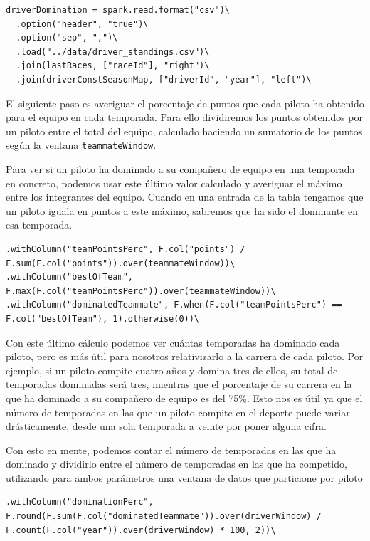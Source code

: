 \documentclass[12pt,twoside,titlepage]{report}
\begin{document}
\begin{lstlisting}
driverDomination = spark.read.format("csv")\
  .option("header", "true")\
  .option("sep", ",")\
  .load("../data/driver_standings.csv")\
  .join(lastRaces, ["raceId"], "right")\
  .join(driverConstSeasonMap, ["driverId", "year"], "left")\
\end{lstlisting}

El siguiente paso es averiguar el porcentaje de puntos que cada piloto ha obtenido para el equipo en cada temporada. Para ello dividiremos los puntos obtenidos por un piloto entre el total del equipo, calculado haciendo un sumatorio de los puntos según la ventana \texttt{teammateWindow}.

Para ver si un piloto ha dominado a su compañero de equipo en una temporada en concreto, podemos usar este último valor calculado y averiguar el máximo entre los integrantes del equipo. Cuando en una entrada de la tabla tengamos que un piloto iguala en puntos a este máximo, sabremos que ha sido el dominante en esa temporada.

\begin{lstlisting}
.withColumn("teamPointsPerc", F.col("points") / F.sum(F.col("points")).over(teammateWindow))\
.withColumn("bestOfTeam", F.max(F.col("teamPointsPerc")).over(teammateWindow))\
.withColumn("dominatedTeammate", F.when(F.col("teamPointsPerc") == F.col("bestOfTeam"), 1).otherwise(0))\
\end{lstlisting}

Con este último cálculo podemos ver cuántas temporadas ha dominado cada piloto, pero es más útil para nosotros relativizarlo a la carrera de cada piloto. Por ejemplo, si un piloto compite cuatro años y domina tres de ellos, su total de temporadas dominadas será tres, mientras que el porcentaje de su carrera en la que ha dominado a su compañero de equipo es del 75\%. Esto nos es útil ya que el número de temporadas en las que un piloto compite en el deporte puede variar drásticamente, desde una sola temporada a veinte por poner alguna cifra.

Con esto en mente, podemos contar el número de temporadas en las que ha dominado y dividirlo entre el número de temporadas en las que ha competido, utilizando para ambos parámetros una ventana de datos que particione por piloto

\begin{lstlisting}
.withColumn("dominationPerc", F.round(F.sum(F.col("dominatedTeammate")).over(driverWindow) / F.count(F.col("year")).over(driverWindow) * 100, 2))\
\end{lstlisting}
\end{document}

